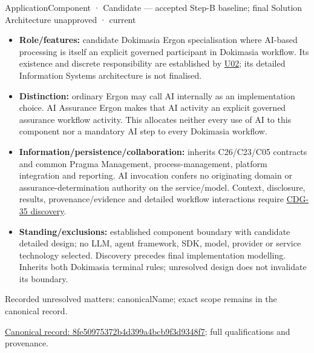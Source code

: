 \label{element:8fe50975372b4d399a4bcb9f3d9348f7}
{\small ApplicationComponent · Candidate — accepted Step-B baseline; final Solution Architecture unapproved · current}\par

\begin{itemize}


\item \textbf{Role/features:} candidate Dokimasia Ergon specialisation where AI-based
  processing is itself an explicit governed participant in Dokimasia workflow.
  Its existence and discrete responsibility are established by \href{\detokenize{../../../../../docs/markdown/05-information-systems-architecture/sources.md#u02}}{U02};
  its detailed Information Systems architecture is not finalised.

\item \textbf{Distinction:} ordinary Ergon may call AI internally as an implementation
  choice. AI Assurance Ergon makes that AI activity an explicit governed assurance
  workflow activity. This allocates neither every use of AI to this component
  nor a mandatory AI step to every Dokimasia workflow.

\item \textbf{Information/persistence/collaboration:} inherits C26/C23/C05 contracts and
  common Pragma Management, process-management, platform integration and reporting.
  AI invocation confers no originating domain or assurance-determination authority
  on the service/model. Context, disclosure, results, provenance/evidence and
  detailed workflow interactions require \href{\detokenize{../../../../../docs/markdown/05-information-systems-architecture/gaps.md#dokimasia-ai-discovery}}{CDG-35 discovery}.

\item \textbf{Standing/exclusions:} established component boundary with candidate detailed
  design; no LLM, agent framework, SDK, model, provider or service technology
  selected. Discovery precedes final implementation modelling. Inherits both
  Dokimasia terminal rules; unresolved design does not invalidate its boundary.

\end{itemize}

{\small Recorded unresolved matters: canonicalName; exact scope remains in the canonical record.}\par
{\footnotesize \href{../../../../continuum/application/application-component/8fe50975372b4d399a4bcb9f3d9348f7.md}{Canonical record: 8fe50975372b4d399a4bcb9f3d9348f7}; full qualifications and provenance.}\par
